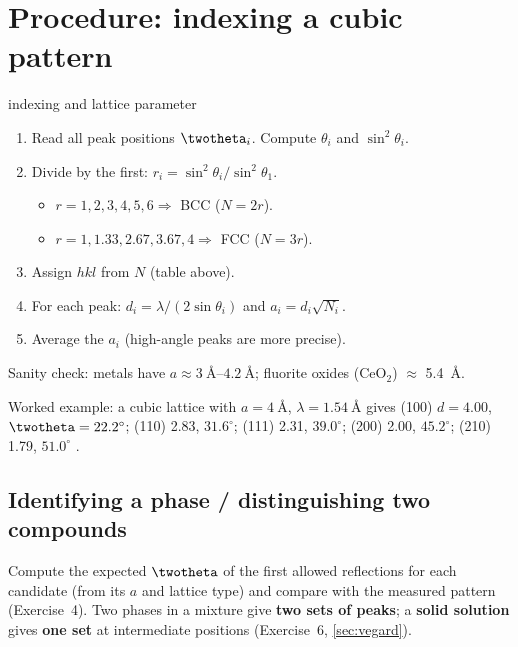 \section{Procedure: indexing a cubic pattern}
\label{sec:xrd-indexing}
\begin{recipe}{indexing and lattice parameter}
\begin{enumerate}
  \item Read all peak positions $\twotheta_i$. Compute $\theta_i$ and $\sin^2\theta_i$.
  \item Divide by the first: $r_i = \sin^2\theta_i/\sin^2\theta_1$.
        \begin{itemize}
          \item $r = 1, 2, 3, 4, 5, 6 \Rightarrow$ BCC ($N = 2r$).
          \item $r = 1, 1.33, 2.67, 3.67, 4 \Rightarrow$ FCC ($N = 3r$).
        \end{itemize}
  \item Assign $hkl$ from $N$ (table above).
  \item For each peak: $d_i = \lambda/(2\sin\theta_i)$ and $a_i = d_i\sqrt{N_i}$.
  \item Average the $a_i$ (high-angle peaks are more precise).
\end{enumerate}
Sanity check: metals have $a\approx\SIrange{3}{4.2}{\angstrom}$; fluorite oxides (CeO$_2$) $\approx$ \SI{5.4}{\angstrom}.
\end{recipe}
Worked example: a cubic lattice with $a = \SI{4}{\angstrom}$, $\lambda = \SI{1.54}{\angstrom}$ gives (100) $d=4.00$, $\twotheta=22.2^\circ$;
(110) 2.83, $31.6^\circ$; (111) 2.31, $39.0^\circ$; (200) 2.00, $45.2^\circ$; (210) 1.79, $51.0^\circ$ .

\subsection*{Identifying a phase / distinguishing two compounds}
Compute the expected $\twotheta$ of the first allowed reflections for each candidate (from its $a$ and lattice type)
and compare with the measured pattern (Exercise~4). Two phases in a mixture give \textbf{two sets of peaks}; a
\textbf{solid solution} gives \textbf{one set} at intermediate positions (Exercise~6, \cref{sec:vegard}).

